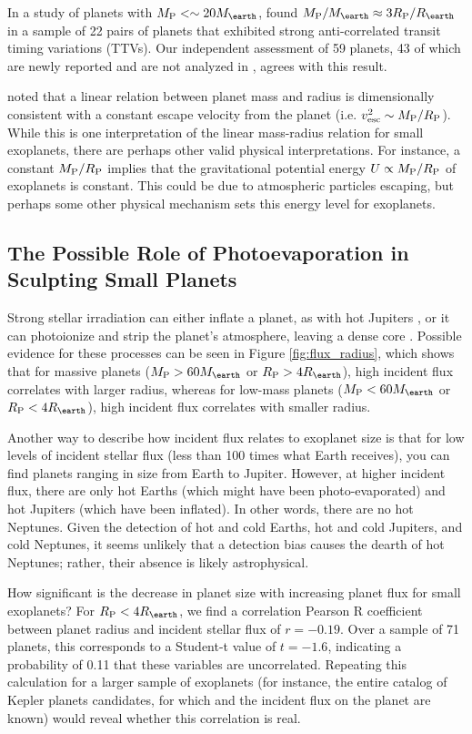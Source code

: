 \documentclass[11pt]{aastex}
\newcommand{\rspecial}{4 \rearth}
\begin{document}
In a study of planets with $\mpl < \sim20\mearth$, \citet{WL2013} found $\mpl/\mearth \approx 3 \rpl/\rearth$ in a sample of 22 pairs of planets that exhibited strong anti-correlated transit timing variations (TTVs).  Our independent assessment of 59 planets, 43 of which are newly reported and are not analyzed in \citet{WL2013}, agrees with this result.

\citet{WL2013} noted that a linear relation between planet mass and radius is dimensionally consistent with a constant escape velocity from the planet (i.e. $v_{\mathrm{esc}}^2 \sim M_{\rm P}/R_{\rm P}$).  While this is one interpretation of the linear mass-radius relation for small exoplanets, there are perhaps other valid physical interpretations.  For instance, a constant $M_{\rm P}/R_{\rm P}$ implies that the gravitational potential energy $U \propto M_{\rm P}/R_{\rm P}$ of exoplanets is constant.  This could be due to atmospheric particles escaping, but perhaps some other physical mechanism sets this energy level for exoplanets.

\subsection{The Possible Role of Photoevaporation in Sculpting Small Planets}
Strong stellar irradiation can either inflate a planet, as with hot Jupiters \citep{Seager2007}, or it can photoionize and strip the planet's atmosphere, leaving a dense core \citep{Lopez2012}.  Possible evidence for these processes can be seen in Figure \ref{fig:flux_radius}, which shows that for massive planets ($\mpl > 60 \mearth $ or $\rpl > \rspecial$), high incident flux correlates with larger radius, whereas for low-mass planets ($\mpl < 60 \mearth $ or $\rpl < \rspecial$), high incident flux correlates with smaller radius.

Another way to describe how incident flux relates to exoplanet size is that for low levels of incident stellar flux (less than 100 times what Earth receives), you can find planets ranging in size from Earth to Jupiter.  However, at higher incident flux, there are only hot Earths (which might have been photo-evaporated) and hot Jupiters (which have been inflated).  In other words, there are no hot Neptunes.  Given the detection of hot and cold Earths, hot and cold Jupiters, and cold Neptunes, it seems unlikely that a detection bias causes the dearth of hot Neptunes; rather, their absence is likely astrophysical.

How significant is the decrease in planet size with increasing planet flux for small exoplanets?  For $\rpl < \rspecial$, we find a correlation Pearson R coefficient between planet radius and incident stellar flux of $r=-0.19$.  Over a sample of 71 planets, this corresponds to a Student-t value of $t=-1.6$, indicating a probability of 0.11 that these variables are uncorrelated.  Repeating this calculation for a larger sample of exoplanets (for instance, the entire catalog of Kepler planets candidates, for which \rpl and the incident flux on the planet are known) would reveal whether this correlation is real.
\end{document}
